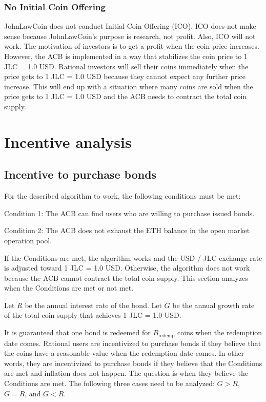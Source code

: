 \documentclass[dvipdfmx,a4paper]{article}
\begin{document}
\subsubsection{No Initial Coin Offering}

JohnLawCoin does not conduct Initial Coin Offering (ICO). ICO does not make sense because JohnLawCoin's purpose is research, not profit. Also, ICO will not work. The motivation of investors is to get a profit when the coin price increases. However, the ACB is implemented in a way that stabilizes the coin price to 1 JLC = 1.0 USD. Rational investors will sell their coins immediately when the price gets to 1 JLC = 1.0 USD because they cannot expect any further price increase. This will end up with a situation where many coins are sold when the price gets to 1 JLC = 1.0 USD and the ACB needs to contract the total coin supply.

\section{Incentive analysis}

\subsection{Incentive to purchase bonds}

For the described algorithm to work, the following conditions must be met:

\begin{description}
\item{Condition 1}: The ACB can find users who are willing to purchase issued bonds.
\item{Condition 2}: The ACB does not exhaust the ETH balance in the open market operation pool.
\end{description}

If the Conditions are met, the algorithm works and the USD / JLC exchange rate is adjusted toward 1 JLC = 1.0 USD. Otherwise, the algorithm does not work because the ACB cannot contract the total coin supply. This section analyzes when the Conditions are met or not met.

Let $R$ be the annual interest rate of the bond. Let $G$ be the annual growth rate of the total coin supply that achieves 1 JLC = 1.0 USD.

It is guaranteed that one bond is redeemed for $B_{\mathrm{redemp}}$ coins when the redemption date comes. Rational users are incentivized to purchase bonds if they believe that the coins have a reasonable value when the redemption date comes. In other words, they are incentivized to purchase bonds if they believe that the Conditions are met and inflation does not happen. The question is when they believe the Conditions are met. The following three cases need to be analyzed: $G>R$, $G=R$, and $G<R$.
\end{document}
